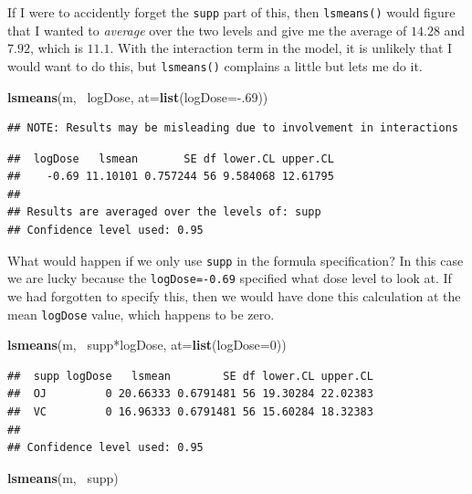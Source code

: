 \documentclass[]{book}
\newenvironment{Shaded}{\begin{snugshade}}{\end{snugshade}}
\newcommand{\KeywordTok}[1]{\textcolor[rgb]{0.13,0.29,0.53}{\textbf{{#1}}}}
\newcommand{\DataTypeTok}[1]{\textcolor[rgb]{0.13,0.29,0.53}{{#1}}}
\newcommand{\DecValTok}[1]{\textcolor[rgb]{0.00,0.00,0.81}{{#1}}}
\newcommand{\NormalTok}[1]{{#1}}
\theoremstyle{definition}
\theoremstyle{definition}
\theoremstyle{remark}
\begin{document}
If I were to accidently forget the \texttt{supp} part of this, then
\texttt{lsmeans()} would figure that I wanted to \emph{average} over the
two levels and give me the average of \(14.28\) and \(7.92\), which is
\(11.1\). With the interaction term in the model, it is unlikely that I
would want to do this, but \texttt{lsmeans()} complains a little but
lets me do it.

\begin{Shaded}
\begin{Highlighting}[]
\KeywordTok{lsmeans}\NormalTok{(m, ~logDose, }\DataTypeTok{at=}\KeywordTok{list}\NormalTok{(}\DataTypeTok{logDose=}\NormalTok{-.}\DecValTok{69}\NormalTok{))}
\end{Highlighting}
\end{Shaded}

\begin{verbatim}
## NOTE: Results may be misleading due to involvement in interactions
\end{verbatim}

\begin{verbatim}
##  logDose   lsmean       SE df lower.CL upper.CL
##    -0.69 11.10101 0.757244 56 9.584068 12.61795
## 
## Results are averaged over the levels of: supp 
## Confidence level used: 0.95
\end{verbatim}

What would happen if we only use \texttt{supp} in the formula
specification? In this case we are lucky because the
\texttt{logDose=-0.69} specified what dose level to look at. If we had
forgotten to specify this, then we would have done this calculation at
the mean \texttt{logDose} value, which happens to be zero.

\begin{Shaded}
\begin{Highlighting}[]
\KeywordTok{lsmeans}\NormalTok{(m, ~supp*logDose, }\DataTypeTok{at=}\KeywordTok{list}\NormalTok{(}\DataTypeTok{logDose=}\DecValTok{0}\NormalTok{))}
\end{Highlighting}
\end{Shaded}

\begin{verbatim}
##  supp logDose   lsmean        SE df lower.CL upper.CL
##  OJ         0 20.66333 0.6791481 56 19.30284 22.02383
##  VC         0 16.96333 0.6791481 56 15.60284 18.32383
## 
## Confidence level used: 0.95
\end{verbatim}

\begin{Shaded}
\begin{Highlighting}[]
\KeywordTok{lsmeans}\NormalTok{(m, ~supp)}
\end{Highlighting}
\end{Shaded}
\end{document}

